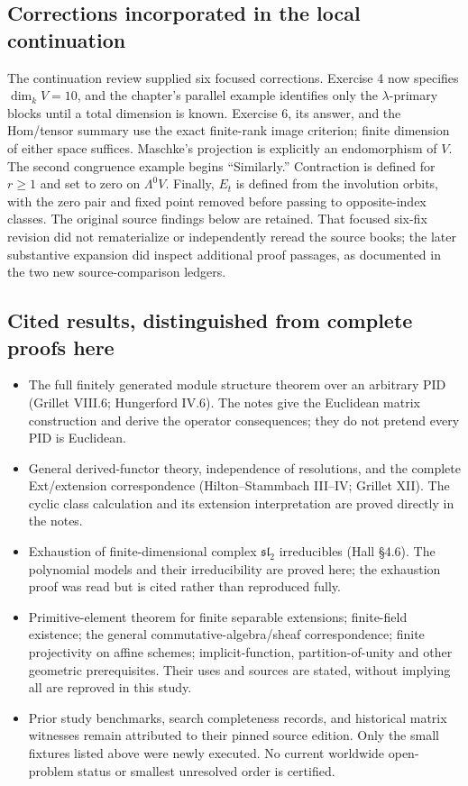 \documentclass[
  11pt,
]{article}
\providecommand{\tightlist}{%
  \setlength{\itemsep}{0pt}\setlength{\parskip}{0pt}}
\begin{document}
\subsection{Corrections incorporated in the local
continuation}\label{corrections-incorporated-in-the-local-continuation}

The continuation review supplied six focused corrections. Exercise 4 now
specifies \(\dim_kV=10\), and the chapter's parallel example identifies
only the \(\lambda\)-primary blocks until a total dimension is known.
Exercise 6, its answer, and the Hom/tensor summary use the exact
finite-rank image criterion; finite dimension of either space suffices.
Maschke's projection is explicitly an endomorphism of \(V\). The second
congruence example begins ``Similarly.'' Contraction is defined for
\(r\ge1\) and set to zero on \(\Lambda^0V\). Finally, \(E_t\) is defined
from the involution orbits, with the zero pair and fixed point removed
before passing to opposite-index classes. The original source findings
below are retained. That focused six-fix revision did not rematerialize
or independently reread the source books; the later substantive
expansion did inspect additional proof passages, as documented in the
two new source-comparison ledgers.

\subsection{Cited results, distinguished from complete proofs
here}\label{cited-results-distinguished-from-complete-proofs-here}

\begin{itemize}
\tightlist
\item
  The full finitely generated module structure theorem over an arbitrary
  PID (Grillet VIII.6; Hungerford IV.6). The notes give the Euclidean
  matrix construction and derive the operator consequences; they do not
  pretend every PID is Euclidean.
\item
  General derived-functor theory, independence of resolutions, and the
  complete Ext/extension correspondence (Hilton--Stammbach III--IV;
  Grillet XII). The cyclic class calculation and its extension
  interpretation are proved directly in the notes.
\item
  Exhaustion of finite-dimensional complex \(\mathfrak{sl}_2\)
  irreducibles (Hall §4.6). The polynomial models and their
  irreducibility are proved here; the exhaustion proof was read but is
  cited rather than reproduced fully.
\item
  Primitive-element theorem for finite separable extensions;
  finite-field existence; the general commutative-algebra/sheaf
  correspondence; finite projectivity on affine schemes;
  implicit-function, partition-of-unity and other geometric
  prerequisites. Their uses and sources are stated, without implying all
  are reproved in this study.
\item
  Prior study benchmarks, search completeness records, and historical
  matrix witnesses remain attributed to their pinned source edition.
  Only the small fixtures listed above were newly executed. No current
  worldwide open-problem status or smallest unresolved order is
  certified.
\end{itemize}
\end{document}
